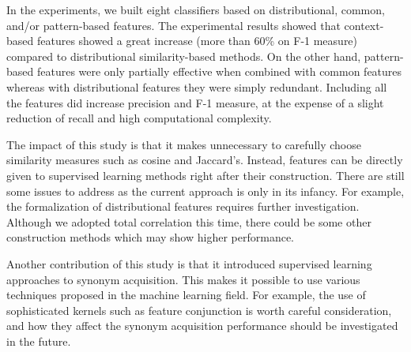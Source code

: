\documentclass[english]{jnlp_1.4}
\begin{document}
In the experiments, we built eight classifiers based on
distributional, common, and/or pattern-based features. The
experimental results showed that context-based features showed a great
increase (more than 60\% on F-1 measure) compared to distributional
similarity-based methods. On the other hand, pattern-based features
were only partially effective when combined with common features
whereas with distributional features they were simply
redundant. Including all the features did increase precision and F-1
measure, at the expense of a slight reduction of recall and high
computational complexity.

The impact of this study is that it makes unnecessary to carefully
choose similarity measures such as cosine and Jaccard's. Instead,
features can be directly given to supervised learning methods right
after their construction. There are still some issues to address as
the current approach is only in its infancy. For example, the
formalization of distributional features requires further
investigation. Although we adopted total correlation this time, there
could be some other construction methods which may show higher
performance.

Another contribution of this study is that it introduced supervised
learning approaches to synonym acquisition. This makes it possible to
use various techniques proposed in the machine learning field. For
example, the use of sophisticated kernels such as feature conjunction
\cite{Oyama:04} is worth careful consideration, and how they affect
the synonym acquisition performance should be investigated in the
future.





    


\begin{biography}



\end{biography}

\biodate
\end{document}
